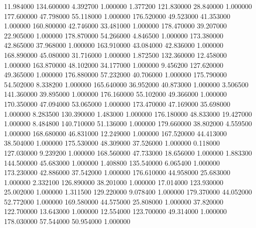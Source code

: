  11.984000 134.600000   4.392700   1.000000
  1.377200 121.830000  28.840000   1.000000
177.600000  47.798000  55.118000   1.000000
176.520000  49.523000  41.353000   1.000000
160.800000  42.746000  33.481000   1.000000
178.470000  39.207000  22.905000   1.000000
178.870000  54.266000   4.846500   1.000000
173.380000  42.865000  37.968000   1.000000
163.910000  43.084000  42.836000   1.000000
168.890000  45.080000  31.716000   1.000000
  1.872500 132.360000  12.458000   1.000000
163.870000  48.102000  34.177000   1.000000
  9.456200 127.620000  49.365000   1.000000
176.880000  57.232000  40.706000   1.000000
175.790000  54.502000   8.338200   1.000000
165.640000  36.952000  40.873000   1.000000
  3.506500 141.360000  39.895000   1.000000
176.160000  55.102000  49.366000   1.000000
170.350000  47.094000  53.065000   1.000000
173.470000  47.169000  35.698000   1.000000
  8.283500 130.390000   1.483000   1.000000
176.180000  48.833000  19.427000   1.000000
  8.484800 140.710000  51.136000   1.000000
179.660000  38.802000   4.559500   1.000000
168.680000  46.831000  12.249000   1.000000
167.520000  44.413000  38.504000   1.000000
175.530000  48.309000  37.526000   1.000000
  0.118000 127.030000   9.239200   1.000000
168.560000  47.733000  18.656000   1.000000
  1.883300 144.500000  45.683000   1.000000
  1.408800 135.540000   6.065400   1.000000
173.230000  42.886000  37.542000   1.000000
176.610000  44.958000  25.683000   1.000000
  2.332100 126.890000  38.201000   1.000000
 17.014000 123.930000  25.002000   1.000000
  1.311500 129.220000   9.078400   1.000000
179.370000  44.052000  52.772000   1.000000
169.580000  44.575000  25.808000   1.000000
 37.820000 122.700000  13.643000   1.000000
 12.554000 123.700000  49.314000   1.000000
178.030000  57.544000  50.954000   1.000000